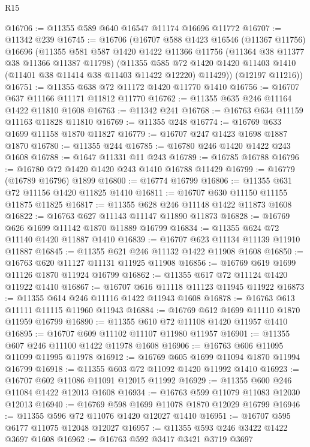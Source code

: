 \begin{lexlean}{R15}
\begin{coremodule}
@16706 := @11355 @589 @640 @16547 @11174 @16696 @11772
@16707 := @11342 @239
@16745 := @16706
    (@16707
      @588
      @1423
      @16546
      (@11367 @11756)
      @16696
      (@11355
        @581
        @587
        @1420
        @1422
        @11366
        @11756
        (@11364 @38 @11377 @38 @11366 @11387 @11798)
        (@11355
          @585
          @72
          @1420
          @1420
          @11403
          @1410
          (@11401 @38 @11414 @38 @11403 @11422 @12220)
          @11429))
      (@12197 @11216))
@16751 := @11355 @638 @72 @11172 @1420 @11770 @1410
@16756 := @16707 @637 @11166 @11171 @11812 @11770
@16762 := @11355 @635 @246 @11164 @1422 @11810 @1608
@16763 := @11342 @241
@16768 := @16763 @634 @11159 @11163 @11828 @11810
@16769 := @11355 @248
@16774 := @16769 @633 @1699 @11158 @1870 @11827
@16779 := @16707 @247 @1423 @1698 @1887 @1870
@16780 := @11355 @244
@16785 := @16780 @246 @1420 @1422 @243 @1608
@16788 := @1647 @11331 @11 @243
@16789 := @16785 @16788
@16796 := @16780 @72 @1420 @1420 @243 @1410 @16788 @11429
@16799 := @16779 (@16789 @16796) @1899
@16800 := @16774 @16799
@16806 := @11355 @631 @72 @11156 @1420 @11825 @1410
@16811 := @16707 @630 @11150 @11155 @11875 @11825
@16817 := @11355 @628 @246 @11148 @1422 @11873 @1608
@16822 := @16763 @627 @11143 @11147 @11890 @11873
@16828 := @16769 @626 @1699 @11142 @1870 @11889 @16799
@16834 := @11355 @624 @72 @11140 @1420 @11887 @1410
@16839 := @16707 @623 @11134 @11139 @11910 @11887
@16845 := @11355 @621 @246 @11132 @1422 @11908 @1608
@16850 := @16763 @620 @11127 @11131 @11925 @11908
@16856 := @16769 @619 @1699 @11126 @1870 @11924 @16799
@16862 := @11355 @617 @72 @11124 @1420 @11922 @1410
@16867 := @16707 @616 @11118 @11123 @11945 @11922
@16873 := @11355 @614 @246 @11116 @1422 @11943 @1608
@16878 := @16763 @613 @11111 @11115 @11960 @11943
@16884 := @16769 @612 @1699 @11110 @1870 @11959 @16799
@16890 := @11355 @610 @72 @11108 @1420 @11957 @1410
@16895 := @16707 @609 @11102 @11107 @11980 @11957
@16901 := @11355 @607 @246 @11100 @1422 @11978 @1608
@16906 := @16763 @606 @11095 @11099 @11995 @11978
@16912 := @16769 @605 @1699 @11094 @1870 @11994 @16799
@16918 := @11355 @603 @72 @11092 @1420 @11992 @1410
@16923 := @16707 @602 @11086 @11091 @12015 @11992
@16929 := @11355 @600 @246 @11084 @1422 @12013 @1608
@16934 := @16763 @599 @11079 @11083 @12030 @12013
@16940 := @16769 @598 @1699 @11078 @1870 @12029 @16799
@16946 := @11355 @596 @72 @11076 @1420 @12027 @1410
@16951 := @16707 @595 @6177 @11075 @12048 @12027
@16957 := @11355 @593 @246 @3422 @1422 @3697 @1608
@16962 := @16763 @592 @3417 @3421 @3719 @3697

\end{coremodule}
\end{lexlean}
